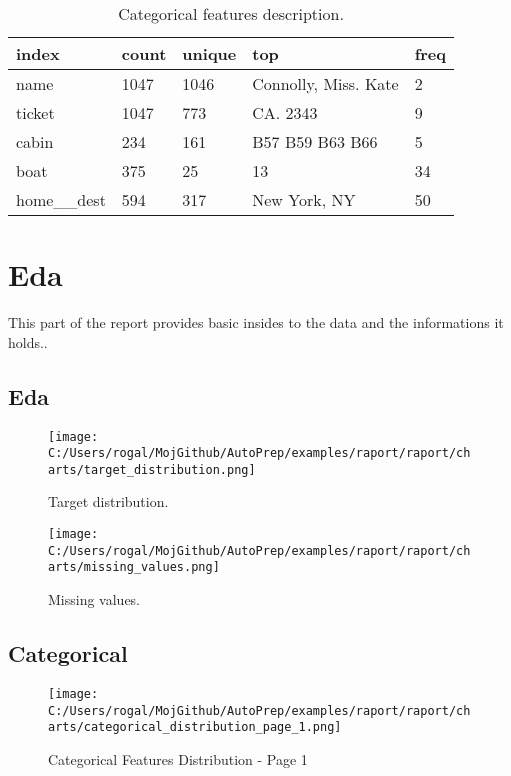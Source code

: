 \documentclass{article}%
\begin{document}
%


\begin{table}[H]%
\begin{center}%
\begin{tabular}{l l l l l}%
\hline%
\textbf{index}&\textbf{count}&\textbf{unique}&\textbf{top}&\textbf{freq}\\%
\hline%
name&1047&1046&Connolly, Miss. Kate&2\\%
ticket&1047&773&CA. 2343&9\\%
cabin&234&161&B57 B59 B63 B66&5\\%
boat&375&25&13&34\\%
home\_\_dest&594&317&New York, NY&50\\%
\hline%
\end{tabular}%
\end{center}%
\caption{Categorical features description.}%
\end{table}

%
\section{Eda}%
\label{sec:Eda}%

%
This part of the report provides basic insides to the data and the informations it holds..%
\subsection{Eda}%
\label{subsec:Eda}%

%


\begin{figure}[H]%
\centering%
\texttt{[image: C:/Users/rogal/MojGithub/AutoPrep/examples/raport/raport/charts/target\_distribution.png]}%
\caption{Target distribution.}%
\end{figure}

%


\begin{figure}[H]%
\centering%
\texttt{[image: C:/Users/rogal/MojGithub/AutoPrep/examples/raport/raport/charts/missing\_values.png]}%
\caption{Missing values.}%
\end{figure}

%
\subsection{Categorical}%
\label{subsec:Categorical}%

%


\begin{figure}[H]%
\centering%
\texttt{[image: C:/Users/rogal/MojGithub/AutoPrep/examples/raport/raport/charts/categorical\_distribution\_page\_1.png]}%
\caption{Categorical Features Distribution {-} Page 1}%
\end{figure}
\end{document}
